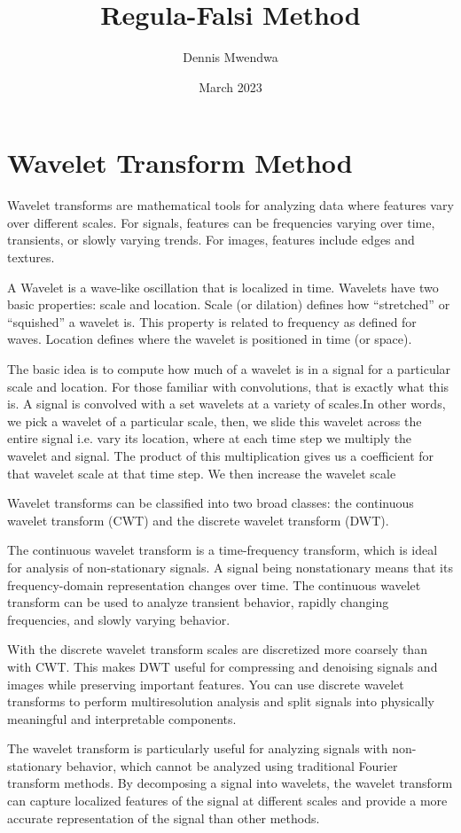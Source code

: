 \documentclass{article}
\title{Regula-Falsi Method}
\author{Dennis Mwendwa}
\date{March 2023}
\begin{document}
\maketitle
\section*{Wavelet Transform Method}
Wavelet transforms are mathematical tools for analyzing data where features vary over different scales. For signals, features can be frequencies varying over time, transients, or slowly varying trends. For images, features include edges and textures.

A Wavelet is a wave-like oscillation that is localized in time. 
Wavelets have two basic properties: scale and location. Scale (or dilation) defines how “stretched” or “squished” a wavelet is. This property is related to frequency as defined for waves. Location defines where the wavelet is positioned in time (or space).

The basic idea is to compute how much of a wavelet is in a signal for a particular scale and location. For those familiar with convolutions, that is exactly what this is. A signal is convolved with a set wavelets at a variety of scales.In other words, we pick a wavelet of a particular scale,  then, we slide this wavelet across the entire signal i.e. vary its location, where at each time step we multiply the wavelet and signal. The product of this multiplication gives us a coefficient for that wavelet scale at that time step. We then increase the wavelet scale 

Wavelet transforms can be classified into two broad classes: the continuous wavelet transform (CWT) and the discrete wavelet transform (DWT).

The continuous wavelet transform is a time-frequency transform, which is ideal for analysis of non-stationary signals. A signal being nonstationary means that its frequency-domain representation changes over time. The continuous wavelet transform can be used to analyze transient behavior, rapidly changing frequencies, and slowly varying behavior.

With the discrete wavelet transform scales are discretized more coarsely than with CWT. This makes DWT useful for compressing and denoising signals and images while preserving important features. You can use discrete wavelet transforms to perform multiresolution analysis and split signals into physically meaningful and interpretable components.

The wavelet transform is particularly useful for analyzing signals with non-stationary behavior, which cannot be analyzed using traditional Fourier transform methods. By decomposing a signal into wavelets, the wavelet transform can capture localized features of the signal at different scales and provide a more accurate representation of the signal than other methods.
\end{document}
